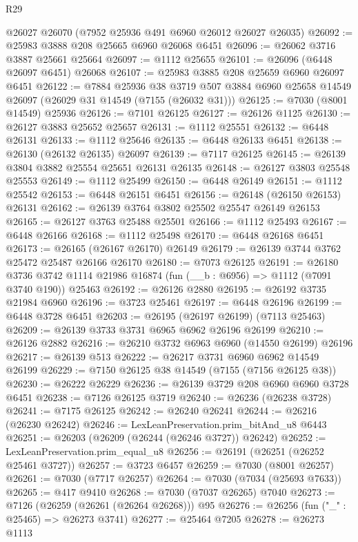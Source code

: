 \begin{lexlean}{R29}
\begin{coremodule}
    @26027
    @26070
    (@7952 @25936 @491 @6960 @26012 @26027 @26035)
@26092 := @25983 @3888 @208 @25665 @6960 @26068 @6451
@26096 := @26062 @3716 @3887 @25661 @25664
@26097 := @1112 @25655
@26101 := @26096 (@6448 @26097 @6451) @26068
@26107 := @25983 @3885 @208 @25659 @6960 @26097 @6451
@26122 := @7884
    @25936
    @38
    @3719
    @507
    @3884
    @6960
    @25658
    @14549
    @26097
    (@26029 @31 @14549 (@7155 (@26032 @31)))
@26125 := @7030 (@8001 @14549) @25936
@26126 := @7101 @26125
@26127 := @26126 @1125
@26130 := @26127 @3883 @25652 @25657
@26131 := @1112 @25551
@26132 := @6448 @26131
@26133 := @1112 @25646
@26135 := @6448 @26133 @6451
@26138 := @26130 (@26132 @26135) @26097
@26139 := @7117 @26125
@26145 := @26139 @3804 @3882 @25554 @25651 @26131 @26135
@26148 := @26127 @3803 @25548 @25553
@26149 := @1112 @25499
@26150 := @6448 @26149
@26151 := @1112 @25542
@26153 := @6448 @26151 @6451
@26156 := @26148 (@26150 @26153) @26131
@26162 := @26139 @3764 @3802 @25502 @25547 @26149 @26153
@26165 := @26127 @3763 @25488 @25501
@26166 := @1112 @25493
@26167 := @6448 @26166
@26168 := @1112 @25498
@26170 := @6448 @26168 @6451
@26173 := @26165 (@26167 @26170) @26149
@26179 := @26139 @3744 @3762 @25472 @25487 @26166 @26170
@26180 := @7073 @26125
@26191 := @26180
    @3736
    @3742
    @1114
    @21986
    @16874
    (fun (__b : @6956) => @1112 (@7091 @3740 @190))
    @25463
@26192 := @26126 @2880
@26195 := @26192 @3735 @21984 @6960
@26196 := @3723 @25461
@26197 := @6448 @26196
@26199 := @6448 @3728 @6451
@26203 := @26195 (@26197 @26199) (@7113 @25463)
@26209 := @26139 @3733 @3731 @6965 @6962 @26196 @26199
@26210 := @26126 @2882
@26216 := @26210 @3732 @6963 @6960 (@14550 @26199) @26196
@26217 := @26139 @513
@26222 := @26217 @3731 @6960 @6962 @14549 @26199
@26229 := @7150 @26125 @38 @14549 (@7155 (@7156 @26125 @38))
@26230 := @26222 @26229
@26236 := @26139 @3729 @208 @6960 @6960 @3728 @6451
@26238 := @7126 @26125 @3719
@26240 := @26236 (@26238 @3728)
@26241 := @7175 @26125
@26242 := @26240 @26241
@26244 := @26216 (@26230 @26242)
@26246 := LexLeanPreservation.prim_bitAnd_u8 @6443
@26251 := @26203 (@26209 (@26244 (@26246 @3727)) @26242)
@26252 := LexLeanPreservation.prim_equal_u8
@26256 := @26191 (@26251 (@26252 @25461 @3727))
@26257 := @3723 @6457
@26259 := @7030 (@8001 @26257)
@26261 := @7030 (@7717 @26257)
@26264 := @7030 (@7034 (@25693 @7633))
@26265 := @417 @9410
@26268 := @7030 (@7037 @26265) @7040
@26273 := @7126 (@26259 (@26261 (@26264 @26268))) @95
@26276 := @26256 (fun ("_" : @25465) => @26273 @3741)
@26277 := @25464 @7205
@26278 := @26273 @1113

\end{coremodule}
\end{lexlean}
